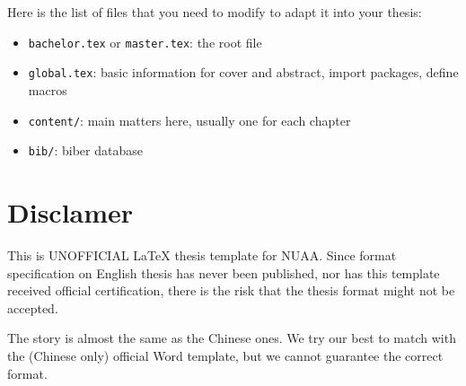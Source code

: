 Here is the list of files that you need to modify to adapt it into your thesis:
\begin{itemize}
  \item \verb|bachelor.tex| or \verb|master.tex|: the root file
  \item \verb|global.tex|: basic information for cover and abstract, import packages, define macros
  \item \verb|content/|: main matters here, usually one for each chapter
  \item \verb|bib/|: biber database
\end{itemize}

\section{Disclamer}

This is UNOFFICIAL \LaTeX{} thesis template for NUAA.
Since format specification on English thesis has never been published,
nor has this template received official certification,
there is the risk that the thesis format might not be accepted.

The story is almost the same as the Chinese ones.
We try our best to match \nuaathesis{} with the (Chinese only) official Word template,
but we cannot guarantee the correct format.
